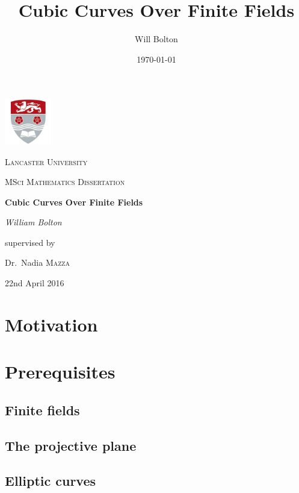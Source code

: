 \documentclass[a4paper,12pt,titlepage,oneside]{article}
\title{Cubic Curves Over Finite Fields}
\author{Will Bolton}
\date{\today}
\begin{document}
\begin{titlepage}
	\centering
	\includegraphics[width=0.15\textwidth]{../Figures/logo.jpg}\par\vspace{1cm}
	{\scshape\LARGE Lancaster University \par}
	\vspace{1cm}
	{\scshape\Large MSci Mathematics Dissertation\par}
	\vspace{1.5cm}
	{\huge\bfseries Cubic Curves Over Finite Fields\par}
	\vspace{2cm}
	{\Large\itshape William Bolton\par}
	\vfill
	supervised by\par
	Dr.~Nadia \textsc{Mazza}

	\vfill

	{\large 22nd April 2016\par}
\end{titlepage}
\tableofcontents
\clearpage

\section*{Motivation}

\clearpage

\section{Prerequisites}
\label{prerequisite-section}
\subsection{Finite fields}

\subsection{The projective plane}

\subsection{Elliptic curves}

\clearpage
\end{document}
